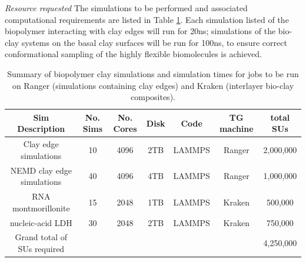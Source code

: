 \begin{compactenum}[a)]



\item \emph{Resource requested}
The simulations to be performed and associated computational requirements are listed
in Table \ref{t:claytable}. Each simulation listed of the biopolymer interacting with clay edges will run for 20ns; simulations of the bio-clay systems on the basal clay surfaces will be run for 100ns, to ensure correct conformational sampling of the highly flexible biomolecules is achieved. 
 
\begin{table}[!h]
\centering

\begin{tabular}[b]
{|>{\scriptsize}c|>{\scriptsize}c|>{\scriptsize}
c|>{\scriptsize}c|>{\scriptsize}c|>{\scriptsize}c|>{\scriptsize}c|}
\hline
\textbf{Sim Description} & \textbf{No. Sims} &
\textbf{No. Cores} & \textbf{Disk} &
\textbf{Code} & \textbf{TG machine} & \textbf{total SUs}\\
\hline 
Clay edge simulations &  10 & 4096 & 2TB & LAMMPS & Ranger & 2,000,000  \\
\hline
NEMD clay edge simulations & 40 & 4096 & 4TB & LAMMPS & Ranger & 1,000,000 \\
\hline
RNA montmorillonite &  15  & 2048 & 1TB & LAMMPS & Kraken & 500,000 \\
\hline
nucleic-acid LDH & 30 & 2048 & 2TB & LAMMPS & Kraken & 750,000 \\ 
\hline
Grand total of SUs required & & & & & & 4,250,000  \\
\hline
\end{tabular} 
\caption{Summary of biopolymer clay simulations and
simulation times for jobs to be run on Ranger (simulations containing clay edges) and Kraken (interlayer bio-clay composites).}
\label{t:claytable}
\end{table}
\end{compactenum}
      

